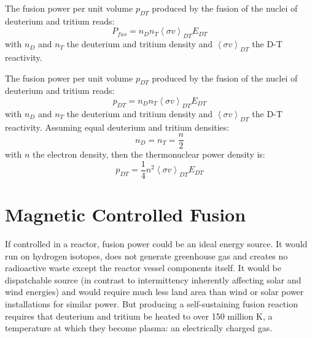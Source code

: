 The fusion power per unit volume $p_{DT}$ produced by the fusion of the nuclei of deuterium and tritium reads: 
\begin{equation*}
	P_{fus} = n_D n_T \left< \sigma v \right>_{DT} E_{DT}
\end{equation*}
with $n_D$ and $n_T$ the deuterium and tritium density and $\left< \sigma v \right>_{DT}$ the D-T reactivity. 


The fusion power per unit volume $p_{DT}$ produced by the fusion of the nuclei of deuterium and tritium reads: 
\begin{equation*}
p_{DT} = n_D n_T \left< \sigma v \right>_{DT} E_{DT}
\end{equation*}
with $n_D$ and $n_T$ the deuterium and tritium density and $\left< \sigma v \right>_{DT}$ the D-T reactivity. Assuming equal deuterium and tritium densities:
\begin{equation*}
n_D = n_T = \frac{n}{2}
\end{equation*}
with $n$ the electron density, then the thermonuclear power density is:
\begin{equation*}
p_{DT} = \frac{1}{4} n^2 \left< \sigma v \right>_{DT} E_{DT}
\end{equation*}

%

\section{Magnetic Controlled Fusion}
If controlled in a reactor, fusion power could be an ideal energy source. It would run on hydrogen isotopes, does not generate greenhouse gas and creates no radioactive waste except the reactor vessel components itself. It would be dispatchable source (in contrast to intermittency inherently affecting solar and wind energies) and would require much less land area than wind or solar power installations for similar power. But producing a self-sustaining fusion reaction requires that deuterium and tritium be heated to over 150 million K, a temperature at which they become plasma: an electrically charged gas. 


